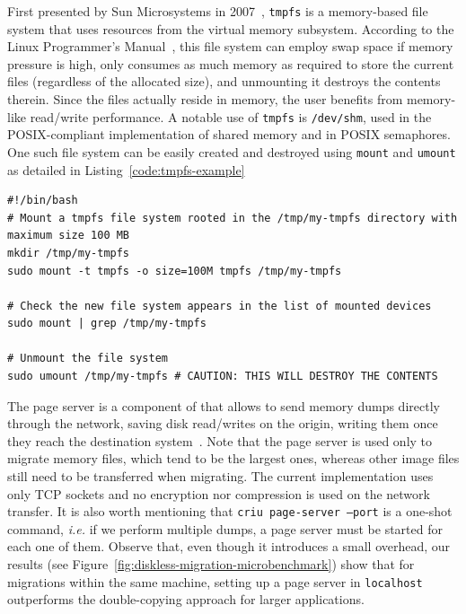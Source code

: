 First presented by Sun Microsystems in 2007~\cite{Snyder2007}, \texttt{tmpfs} is a memory-based file system that uses resources from the virtual memory subsystem.
According to the Linux Programmer's Manual~\cite{tmpfs-manpage}, this file system can employ swap space if memory pressure is high, only consumes as much memory as required to store the current files (regardless of the allocated size), and unmounting it destroys the contents therein.
Since the files actually reside in memory, the user benefits from memory-like read/write performance.
A notable use of \texttt{tmpfs} is \texttt{/dev/shm}, used in the POSIX-compliant implementation of shared memory and in POSIX semaphores.
One such file system can be easily created and destroyed using \texttt{mount} and \texttt{umount} as detailed in Listing~\ref{code:tmpfs-example}
\begin{lstlisting}[style=Bash,caption={Mounting and dismounting a \texttt{tmpfs} file system.},label={code:tmpfs-example}]
#!/bin/bash
# Mount a tmpfs file system rooted in the /tmp/my-tmpfs directory with maximum size 100 MB
mkdir /tmp/my-tmpfs
sudo mount -t tmpfs -o size=100M tmpfs /tmp/my-tmpfs

# Check the new file system appears in the list of mounted devices
sudo mount | grep /tmp/my-tmpfs

# Unmount the file system 
sudo umount /tmp/my-tmpfs # CAUTION: THIS WILL DESTROY THE CONTENTS
\end{lstlisting}

The page server is a component of \criu that allows to send memory dumps directly through the network, saving disk read/writes on the origin, writing them once they reach the destination system~\cite{criu-page-server}.
Note that the page server is used only to migrate memory files, which tend to be the largest ones, whereas other image files still need to be transferred when migrating.
The current implementation uses only TCP sockets and no encryption nor compression is used on the network transfer.
It is also worth mentioning that \texttt{criu page-server --port} is a one-shot command, \textit{i.e.} if we perform multiple dumps, a page server must be started for each one of them.
Observe that, even though it introduces a small overhead, our results (see Figure~\ref{fig:diskless-migration-microbenchmark}) show that for migrations within the same machine, setting up a page server in \texttt{localhost} outperforms the double-copying approach for larger applications.

